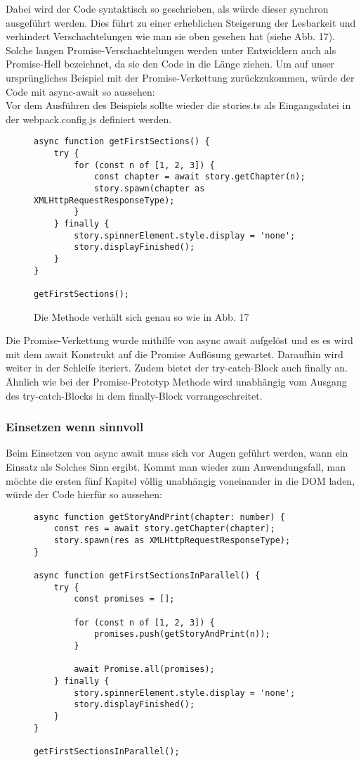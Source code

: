 \noindent
Dabei wird der Code syntaktisch so geschrieben, als würde dieser synchron ausgeführt werden. Dies führt zu einer erheblichen Steigerung der Lesbarkeit und verhindert Verschachtelungen wie man sie oben gesehen hat (siehe Abb. 17). Solche langen Promise-Verschachtelungen werden unter Entwicklern auch als \glqq{}Promise-Hell\grqq{} bezeichnet, da sie den Code in die Länge ziehen. Um auf unser ursprüngliches Beispiel mit der Promise-Verkettung zurückzukommen, würde der Code mit async-await so aussehen:\\

\noindent
Vor dem Ausführen des Beispiels sollte wieder die stories.ts als Eingangsdatei in der webpack.config.js definiert werden.

\begin{figure}[H]
\begin{lstlisting}
async function getFirstSections() {
    try {
        for (const n of [1, 2, 3]) {
            const chapter = await story.getChapter(n);
            story.spawn(chapter as XMLHttpRequestResponseType);
        }
    } finally {
        story.spinnerElement.style.display = 'none';
        story.displayFinished();
    }
}

getFirstSections();
\end{lstlisting}
\caption{Die Methode verhält sich genau so wie in Abb. 17}
\end{figure}

\noindent
Die Promise-Verkettung wurde mithilfe von async await aufgelöst und es es wird mit dem await Konstrukt auf die Promise Auflösung gewartet. Daraufhin wird weiter in der Schleife iteriert. Zudem bietet der try-catch-Block auch finally an. Ähnlich wie bei der Promise-Prototyp Methode wird unabhängig vom Ausgang des try-catch-Blocks in dem finally-Block vorrangeschreitet.

\subsubsection{Einsetzen wenn sinnvoll}

Beim Einsetzen von async await muss sich vor Augen geführt werden, wann ein Einsatz als Solches Sinn ergibt. Kommt man wieder zum Anwendungsfall, man möchte die ersten fünf Kapitel völlig unabhängig voneinander in die DOM laden, würde der Code hierfür so aussehen:

\begin{figure}[H]
\begin{lstlisting}
async function getStoryAndPrint(chapter: number) {
    const res = await story.getChapter(chapter);
    story.spawn(res as XMLHttpRequestResponseType);
}

async function getFirstSectionsInParallel() {
    try {
        const promises = [];

        for (const n of [1, 2, 3]) {
            promises.push(getStoryAndPrint(n));
        }

        await Promise.all(promises);
    } finally {
        story.spinnerElement.style.display = 'none';
        story.displayFinished();
    }
}

getFirstSectionsInParallel();
\end{lstlisting}
\end{figure}

